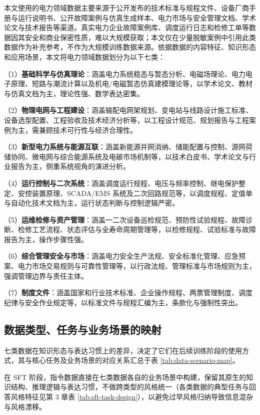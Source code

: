 \documentclass[fontset=fandol,type=master,campus=shenzhen,etitleauto=true]{hithesisbook}
\begin{document}
本文使用的电力领域数据主要来源于公开发布的技术标准与规程文件、设备厂商手册与运行说明书、公开故障案例与仿真生成样本、电力市场与安全管理文档、学术论文与技术报告等渠道。真实电力企业故障案例库、调度运行日志和检修工单等数据因其安全和商业保密性质，难以大规模获取；本文仅在少量脱敏案例中引用此类数据作为补充参考，不作为大规模训练数据来源。依据数据的内容特征、知识形态和应用场景，本文将电力领域数据划分为以下七类：

\noindent （1）\textbf{基础科学与仿真理论}：涵盖电力系统稳态与暂态分析、电磁场理论、电力电子原理、短路与潮流计算以及机电/电磁暂态仿真建模理论等，以学术论文、教材与仿真文档为主，理论性强、数学表达密集。

\noindent （2）\textbf{物理电网与工程建设}：涵盖输配电网架规划、变电站与线路设计施工标准、设备选型配置、工程验收及技术经济分析等，以工程设计规范、规划报告与工程案例为主，需兼顾技术可行性与经济合理性。

\noindent （3）\textbf{新型电力系统与能源互联}：涵盖新能源并网消纳、储能配置与控制、源网荷储协同、微电网与综合能源系统及电碳市场机制等，以技术白皮书、学术论文与行业报告为主，侧重系统视角的演进分析。

\noindent （4）\textbf{运行控制与二次系统}：涵盖调度运行规程、电压与频率控制、继电保护整定、安控装置原理、SCADA/EMS 系统及二次回路规范等，以调度规程、定值单与自动化技术文档为主，运行状态判断与控制逻辑严密。

\noindent （5）\textbf{运维检修与资产管理}：涵盖一二次设备巡检规范、预防性试验规程、故障诊断、检修工艺流程、状态评估与全寿命周期管理等，以检修规程、试验标准与故障报告为主，操作步骤性强。

\noindent （6）\textbf{综合管理安全与市场}：涵盖电力安全生产法规、安全标准化管理、应急预案、电力市场交易规则与可靠性管理等，以行政法规、管理标准与市场规则为主，强调管理边界与责任主体。

\noindent （7）\textbf{制度文件}：涵盖国家和行业技术标准、企业操作规程、两票管理制度、调度纪律与安全作业规定等，以标准文件与规程汇编为主，条款化与强制性突出。

\subsection{数据类型、任务与业务场景的映射}\label{subsec:data-mapping}

七类数据在知识形态与表达习惯上的差异，决定了它们在后续训练阶段的使用方式，其与核心任务及业务场景的对应关系汇总于表 \ref{tab:data-scenario-map}。

在 SFT 阶段，指令数据直接在七类数据各自的业务场景中构建，保留其原生的知识结构、推理逻辑与表达习惯，不做跨类型的风格统一（各类数据的典型任务与回答风格特征见第 3 章表 \ref{tab:sft-task-design}），以避免过早风格归纳导致信息混杂与风格漂移。
\end{document}
